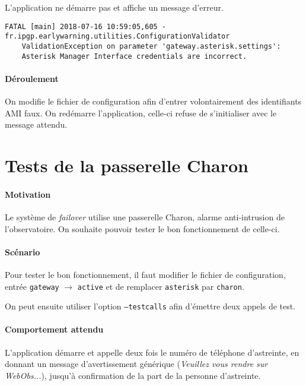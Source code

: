 \documentclass{article}
\begin{document}
L'application ne démarre pas et affiche un message d'erreur.

\begin{verbatim}
FATAL [main] 2018-07-16 10:59:05,605 - fr.ipgp.earlywarning.utilities.ConfigurationValidator
    ValidationException on parameter 'gateway.asterisk.settings': 
    Asterisk Manager Interface credentials are incorrect.
\end{verbatim}

\paragraph{Déroulement\\}

On modifie le fichier de configuration afin d'entrer volontairement des identifiants AMI faux. On redémarre l'application, celle-ci refuse de s'initialiser avec le message attendu.

\pagebreak
\section{Tests de la passerelle Charon}

\paragraph{Motivation\\}

Le système de \emph{failover} utilise une passerelle Charon, alarme anti-intrusion de l'observatoire. On souhaite pouvoir tester le bon fonctionnement de celle-ci. 

\paragraph{Scénario\\}

Pour tester le bon fonctionnement, il faut modifier le fichier de configuration, entrée \texttt{gateway} $ \rightarrow $ \texttt{active} et de remplacer \texttt{asterisk} par \texttt{charon}.

On peut ensuite utiliser l'option \texttt{--testcalls} afin d'émettre deux appels de test.

\paragraph{Comportement attendu\\}

L'application démarre et appelle deux fois le numéro de téléphone d'astreinte, en donnant un message d'avertissement générique (\emph{Veuillez vous rendre sur WebObs...}), jusqu'à confirmation de la part de la personne d'astreinte.
\end{document}
